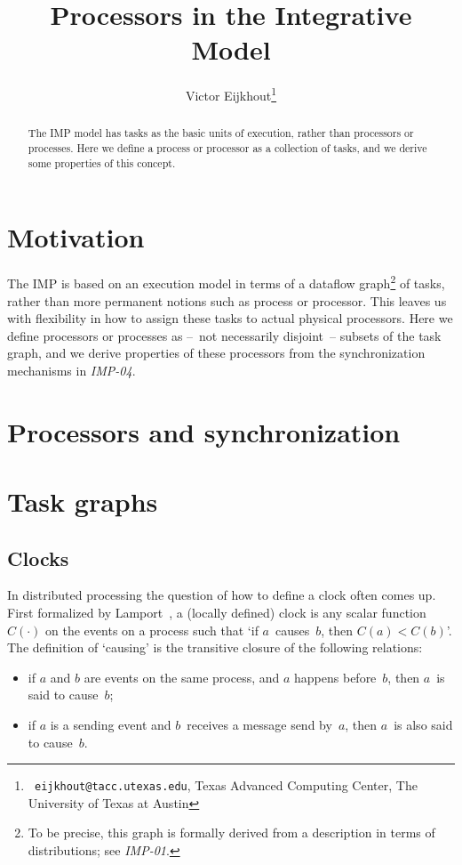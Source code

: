 \documentclass[11pt,fleqn,preprint]{impreport}
\title[IMP processors]{Processors in the Integrative Model}
\author[Eijkhout]{Victor Eijkhout\thanks{{\tt
      eijkhout@tacc.utexas.edu}, Texas Advanced Computing Center, The
    University of Texas at Austin}}
\begin{document}
\maketitle

\begin{abstract}
The IMP model has tasks as the basic units of execution, rather
than processors or processes.
Here we define a process or processor as a collection of tasks,
and we derive some properties of this concept.
\end{abstract}

\section{Motivation}

The \acf{IMP} is based on an execution model in terms
of a dataflow graph\footnote{To be precise, this graph is formally
derived from a description in terms of distributions; see \emph{IMP-01}.}
of tasks, rather than more permanent
notions such as process or processor. This leaves us
with flexibility in how to assign these tasks to actual
physical processors. 
Here we define processors or processes as 
--~not necessarily disjoint~-- subsets of the task graph,
and we derive properties of these processors from
the synchronization mechanisms in \emph{IMP-04}.

\section{Processors and synchronization}


\section{Task graphs}


\subsection{Clocks}

In distributed processing the question of how to define
a clock often comes up. First formalized by Lamport~\cite{lamport:clock},
a (locally defined) clock is any scalar function $C(\cdot)$
on the events on a process such that `if $a$~causes~$b$, then $C(a)<C(b)$'.
The definition of `causing' is the transitive closure of the
following relations:
\begin{itemize}
\item if $a$ and $b$ are events on the same process,
  and $a$ happens before~$b$, then $a$~is said to cause~$b$;
\item if $a$ is a sending event and $b$~receives a message
  send by~$a$, then $a$~is also said to cause~$b$.
\end{itemize}
\end{document}
